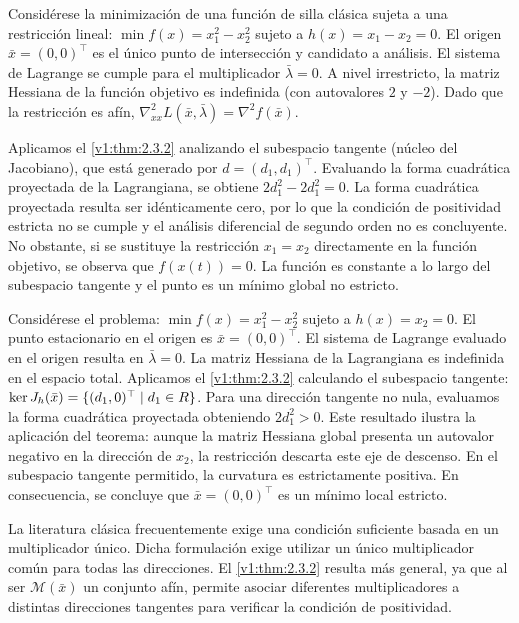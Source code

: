 \begin{example}\label{v1:exa:2.3.2}
 Considérese la minimización de una función de silla clásica sujeta a una restricción lineal: $\min f(x) = x_1^2 - x_2^2$ sujeto a $h(x) = x_1 - x_2 = 0$. El origen $\bar{x} = (0,0)^\top$ es el único punto de intersección y candidato a análisis. El sistema de Lagrange se cumple para el multiplicador $\bar{\lambda} = 0$. A nivel irrestricto, la matriz Hessiana de la función objetivo es indefinida (con autovalores $2$ y $-2$). Dado que la restricción es afín, $\nabla_{xx}^2 L(\bar{x}, \bar{\lambda}) = \nabla^2 f(\bar{x})$. 
 
 Aplicamos el \cref{v1:thm:2.3.2} analizando el subespacio tangente (núcleo del Jacobiano), que está generado por $d = (d_1, d_1)^\top$. Evaluando la forma cuadrática proyectada de la Lagrangiana, se obtiene $2d_1^2 - 2d_1^2 = 0$. La forma cuadrática proyectada resulta ser idénticamente cero, por lo que la condición de positividad estricta no se cumple y el análisis diferencial de segundo orden no es concluyente. No obstante, si se sustituye la restricción $x_1 = x_2$ directamente en la función objetivo, se observa que $f(x(t)) = 0$. La función es constante a lo largo del subespacio tangente y el punto es un mínimo global no estricto.
\end{example}

\begin{example}\label{v1:exa:2.3.3}
 Considérese el problema: $\min f(x) = x_1^2 - x_2^2$ sujeto a $h(x) = x_2 = 0$. El punto estacionario en el origen es $\bar{x} = (0,0)^\top$. El sistema de Lagrange evaluado en el origen resulta en $\bar{\lambda} = 0$. La matriz Hessiana de la Lagrangiana es indefinida en el espacio total. Aplicamos el \cref{v1:thm:2.3.2} calculando el subespacio tangente: $\ker J_h(\bar{x}) = \{ (d_1, 0)^\top \mid d_1 \in R \}$. Para una dirección tangente no nula, evaluamos la forma cuadrática proyectada obteniendo $2d_1^2 > 0$. Este resultado ilustra la aplicación del teorema: aunque la matriz Hessiana global presenta un autovalor negativo en la dirección de $x_2$, la restricción descarta este eje de descenso. En el subespacio tangente permitido, la curvatura es estrictamente positiva. En consecuencia, se concluye que $\bar{x} = (0,0)^\top$ es un mínimo local estricto.
\end{example}

\begin{warningbox}
 La literatura clásica frecuentemente exige una condición suficiente basada en un multiplicador único. Dicha formulación exige utilizar un único multiplicador común para todas las direcciones. El \cref{v1:thm:2.3.2} resulta más general, ya que al ser $\mathcal{M}(\bar{x})$ un conjunto afín, permite asociar diferentes multiplicadores a distintas direcciones tangentes para verificar la condición de positividad.
\end{warningbox}

